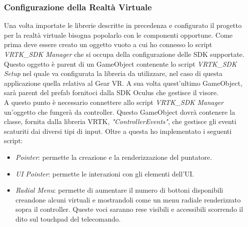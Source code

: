 \subsubsection{Configurazione della Realtà Virtuale}
Una volta importate le librerie descritte in precedenza e configurato il progetto per la realtà virtuale bisogna popolarlo con le componenti opportune. Come prima deve essere creato un oggetto vuoto a cui ho connesso lo script \textit{VRTK\_SDK Manager} che si occupa della configurazione delle SDK supportate. Questo oggetto è parent di un GameObject contenente lo script \textit{VRTK\_SDK Setup} nel quale va configurata la libreria da utilizzare, nel caso di questa applicazione quella relativa al Gear VR. A sua volta quest'ultimo GameObject, sarà parent del prefab fornitoci dalla SDK Oculus che gestisce il visore. \\
A questo punto è necessario connettere allo script \textit{VRTK\_SDK Manager} un'oggetto che fungerà da controller. Questo GameObject dovrà contenere la classe, fornita dalla libreria VRTK, \textit{"ControllerEvents"}, che gestisce gli eventi scaturiti dai diversi tipi di input. Oltre a questa ho implementato i seguenti script:
\begin{itemize}
	\item  \textit{Pointer}: permette la creazione e la renderizzazione del puntatore.
	\item  \textit{UI Pointer}: permette le interazioni con gli elementi dell'UI.

\end{itemize}
\begin{minipage}[h]{0.75\textwidth}
	\begin{itemize}
		\item \textit{Radial Menu}: permette di aumentare il numero di bottoni disponibili creandone alcuni virtuali e mostrandoli come un menu radiale renderizzato sopra il controller. Queste voci saranno rese visibili e accessibili scorrendo il dito sul touchpad del telecomando.
	\end{itemize}
\end{minipage}
\hfill
